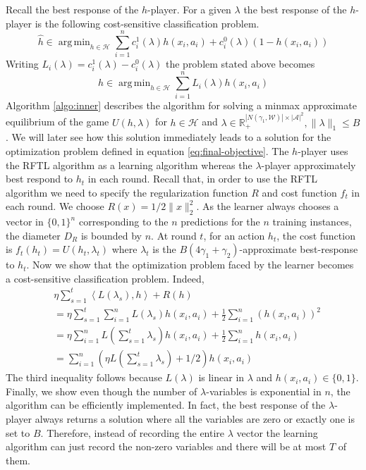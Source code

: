 \documentclass{article}
\renewcommand{\hat}{\widehat}
\newcommand{\set}[1]{\{#1\}}
\newcommand{\bbR}{\mathbb{R}}
\DeclareMathOperator*{\argmin}{arg\,min}
\newcommand{\WW}{\mathcal{W}}
\newcommand{\abs}[1]{\left|#1\right|}
\newcommand{\Ac}{\mathcal{A}}
\newcommand{\HH}{\mathcal{H}}
\newcommand{\eps}{\varepsilon}
\newcommand{\norm}[1]{\lVert #1 \rVert}
\begin{document}
Recall the best response of the $h$-player. For a given $\lambda$ the best response of the $h$-player is the following cost-sensitive classification problem.
\begin{equation}
\hat{h} \in \argmin_{h \in \HH} \sum_{i=1}^n c^1_i (\lambda) h(x_i,a_i) + c^0_i(\lambda) (1 - h(x_i,a_i))
\end{equation}
Writing $L_i(\lambda) = c^1_i(\lambda) - c^0_i(\lambda)$ the problem stated above becomes
\begin{equation}
\hat{h} \in \argmin_{h \in \HH} \sum_{i=1}^n L_i(\lambda) h(x_i,a_i)
\end{equation}
Algorithm \ref{algo:inner} describes the algorithm for solving a minmax approximate equilibrium of the game $U(h,\lambda)$ for $h \in \HH$ and $\lambda \in \bbR^{\abs{N(\gamma_1,\WW)}\times \abs{\Ac}^2}_+, \norm{\lambda}_1 \le B$. We will later see how this solution immediately leads to a solution for the optimization problem defined in equation \ref{eq:final-objective}. The $h$-player uses the RFTL algorithm as a learning algorithm whereas the $\lambda$-player approximately best respond to $h_t$ in each round. Recall that, in order to use the RFTL algorithm we need to specify the regularization function $R$ and cost function $f_t$ in each round. We choose $R(x) = 1/2\norm{x}_2^2$. As the learner always chooses a vector in $\set{0,1}^n$ corresponding to the $n$ predictions for the $n$ training instances, the diameter $D_R$ is bounded by $n$. At round $t$, for an action $h_t$, the cost function is $f_t(h_t) = U(h_t,\lambda_t)$ where $\lambda_t$ is the $B(4\gamma_1 + \gamma_2)$-approximate best-response to $h_t$. Now we show that the optimization problem faced by the learner becomes a cost-sensitive classification problem. Indeed,
\begin{align*}
&\eta \sum_{s=1}^t \left \langle L(\lambda_s), h \right \rangle + R(h) \\
&= \eta \sum_{s=1}^t \sum_{i=1}^n L(\lambda_s) h(x_i,a_i) + \frac{1}{2} \sum_{i=1}^n (h(x_i,a_i))^2 \\
&= \eta \sum_{i=1}^n L(\sum_{s=1}^t \lambda_s) h(x_i,a_i) + \frac{1}{2} \sum_{i=1}^n h(x_i,a_i) \\
&= \sum_{i=1}^n (\eta L(\sum_{s=1}^t \lambda_s) + 1/2) h(x_i,a_i)
\end{align*}
The third inequality follows because $L(\lambda)$ is linear in $\lambda$ and $h(x_i,a_i) \in \set{0,1}$. Finally, we show even though the number of $\lambda$-variables is exponential in $n$, the algorithm can be efficiently implemented. In fact, the best response of the $\lambda$-player always returns a solution where all the variables are zero or exactly one is set to $B$. Therefore, instead of recording the entire $\lambda$ vector the learning algorithm can just record the non-zero variables and there will be at most $T$ of them.
\end{document}
